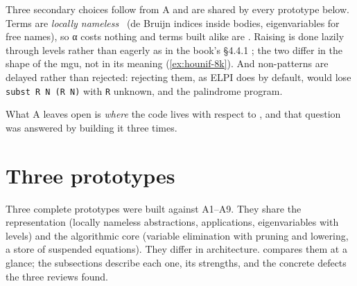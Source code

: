 Three secondary choices follow from A and are shared by every prototype below. Terms are
\emph{locally nameless}~\cite{McBrideMcKinna2004,Chargueraud2012} (de Bruijn indices inside bodies,
eigenvariables for free names), so α costs
nothing and terms built alike are . Raising is done lazily through levels rather than
eagerly as in the book's §4.4.1 ; the two differ in the shape of the mgu, not in its meaning
(\cref{ex:hounif-8k}). And non-patterns are delayed rather than rejected: rejecting them, as ELPI does
by default, would lose \texttt{subst R N (R N)} with \texttt{R} unknown, and the palindrome program.

What A leaves open is \emph{where} the code lives with respect to \micro, and that question was
answered by building it three times.

\section{Three prototypes}\label{sec:design-prototypes}

Three complete prototypes were built against A1--A9. They share the representation (locally nameless
abstractions, applications, eigenvariables with levels) and the algorithmic core (variable elimination
with pruning and lowering, a store of suspended equations). They differ in architecture.
 compares them at a glance; the subsections describe each one, its strengths,
and the concrete defects the three reviews found.

